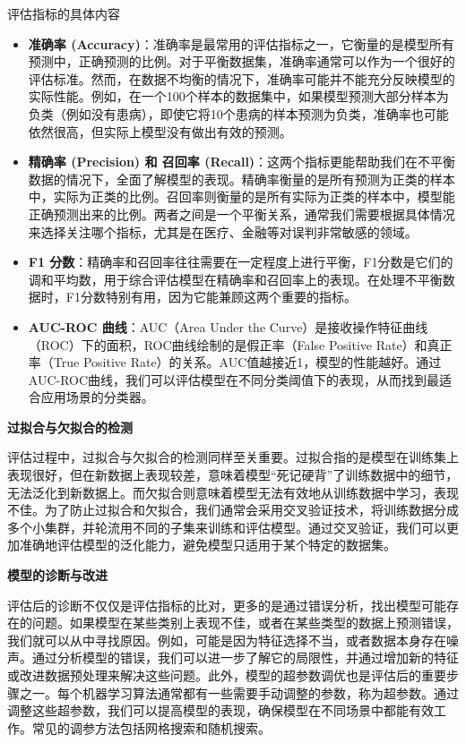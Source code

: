 评估指标的具体内容
\begin{itemize}
    \item \textbf{准确率 (Accuracy)}：准确率是最常用的评估指标之一，它衡量的是模型所有预测中，正确预测的比例。对于平衡数据集，准确率通常可以作为一个很好的评估标准。然而，在数据不均衡的情况下，准确率可能并不能充分反映模型的实际性能。例如，在一个100个样本的数据集中，如果模型预测大部分样本为负类（例如没有患病），即使它将10个患病的样本预测为负类，准确率也可能依然很高，但实际上模型没有做出有效的预测。
    \item \textbf{精确率 (Precision) 和 召回率 (Recall)}：这两个指标更能帮助我们在不平衡数据的情况下，全面了解模型的表现。精确率衡量的是所有预测为正类的样本中，实际为正类的比例。召回率则衡量的是所有实际为正类的样本中，模型能正确预测出来的比例。两者之间是一个平衡关系，通常我们需要根据具体情况来选择关注哪个指标，尤其是在医疗、金融等对误判非常敏感的领域。
    \item \textbf{F1 分数}：精确率和召回率往往需要在一定程度上进行平衡，F1分数是它们的调和平均数，用于综合评估模型在精确率和召回率上的表现。在处理不平衡数据时，F1分数特别有用，因为它能兼顾这两个重要的指标。
    \item \textbf{AUC-ROC 曲线}：AUC（Area Under the Curve）是接收操作特征曲线（ROC）下的面积，ROC曲线绘制的是假正率（False Positive Rate）和真正率（True Positive Rate）的关系。AUC值越接近1，模型的性能越好。通过AUC-ROC曲线，我们可以评估模型在不同分类阈值下的表现，从而找到最适合应用场景的分类器。
\end{itemize}

\textbf{过拟合与欠拟合的检测}

评估过程中，过拟合与欠拟合的检测同样至关重要。过拟合指的是模型在训练集上表现很好，但在新数据上表现较差，意味着模型“死记硬背”了训练数据中的细节，无法泛化到新数据上。而欠拟合则意味着模型无法有效地从训练数据中学习，表现不佳。为了防止过拟合和欠拟合，我们通常会采用交叉验证技术，将训练数据分成多个小集群，并轮流用不同的子集来训练和评估模型。通过交叉验证，我们可以更加准确地评估模型的泛化能力，避免模型只适用于某个特定的数据集。

\textbf{模型的诊断与改进}

评估后的诊断不仅仅是评估指标的比对，更多的是通过错误分析，找出模型可能存在的问题。如果模型在某些类别上表现不佳，或者在某些类型的数据上预测错误，我们就可以从中寻找原因。例如，可能是因为特征选择不当，或者数据本身存在噪声。通过分析模型的错误，我们可以进一步了解它的局限性，并通过增加新的特征或改进数据预处理来解决这些问题。此外，模型的超参数调优也是评估后的重要步骤之一。每个机器学习算法通常都有一些需要手动调整的参数，称为超参数。通过调整这些超参数，我们可以提高模型的表现，确保模型在不同场景中都能有效工作。常见的调参方法包括网格搜索和随机搜索。


